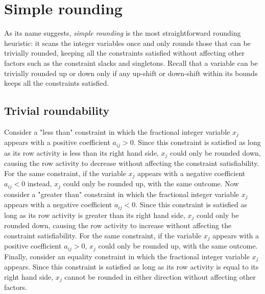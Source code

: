 \documentclass[a4paper,12pt,twoside]{scrbook}
\begin{document}
\section{Simple rounding} \label{sec:simplerounding}
As its name suggests, \textit{simple rounding} is the most straightforward rounding heuristic: it scans the integer variables once and only rounds those that can be trivially rounded, keeping all the constraints satisfied without affecting other factors such as the constraint slacks and singletons.
Recall that a variable can be trivially rounded up or down only if any up-shift or down-shift within its bounds keeps all the constraints satisfied. \par

\subsection{Trivial roundability} \label{sec:trivialround}
Consider a "less than" constraint in which the fractional integer variable $x_j$ appears with a positive coefficient $a_{ij} > 0$. Since this constraint is satisfied as long as its row activity is less than its right hand side, $x_j$ could only be rounded down, causing the row activity to decrease without affecting the constraint satisfiability. For the same constraint, if the variable $x_j$ appears with a negative coefficient $a_{ij} < 0$ instead, $x_j$ could only be rounded up, with the same outcome.
Now consider a "greater than" constraint in which the fractional integer variable $x_j$ appears with a negative coefficient $a_{ij} < 0$. Since this constraint is satisfied as long as its row activity is greater than its right hand side, $x_j$ could only be rounded down, causing the row activity to increase without affecting the constraint satisfiability. For the same constraint, if the variable $x_j$ appears with a positive coefficient $a_{ij} > 0$, $x_j$ could only be rounded up, with the same outcome.
Finally, consider an equality constraint in which the fractional integer variable $x_j$ appears. Since this constraint is satisfied as long as its row activity is equal to its right hand side, $x_j$ cannot be rounded in either direction without affecting other factors. \par
\end{document}
